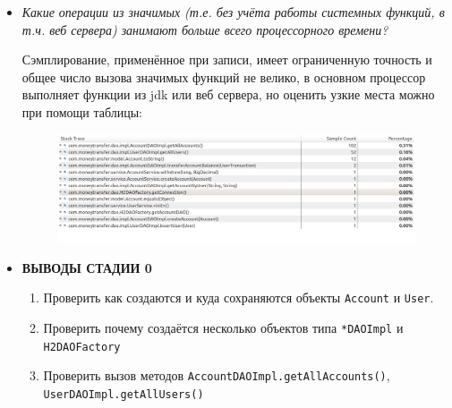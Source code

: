 \documentclass{article}
\begin{document}
\begin{itemize}
		\newpage
		\item \textit{Какие операции из значимых (т.е. без учёта работы системных функций, в т.ч. веб сервера) занимают больше всего процессорного времени?}

		Сэмплирование, применённое при записи, имеет ограниченную точность и общее число вызова значимых функций не велико, 
		в основном процессор выполняет функции из jdk или веб сервера, но оценить узкие места можно при помощи таблицы: 

		\begin{figure}[h!] %
			\centering
			\includegraphics[width=0.95\linewidth]{img/stage_0/hotmethods.png}
			\label{fig:hotmethods0}
		\end{figure}

		\item \textbf{ВЫВОДЫ СТАДИИ 0}
		\begin{enumerate}
			\item Проверить как создаются и куда сохраняются объекты \texttt{Account} и \texttt{User}.
			\item Проверить почему создаётся несколько объектов типа \texttt{*DAOImpl} и \texttt{H2DAOFactory}
			\item Проверить вызов методов \texttt{AccountDAOImpl.getAllAccounts()}, \texttt{UserDAOImpl.getAllUsers()}
		\end{enumerate}
	\end{itemize}
\end{document}
